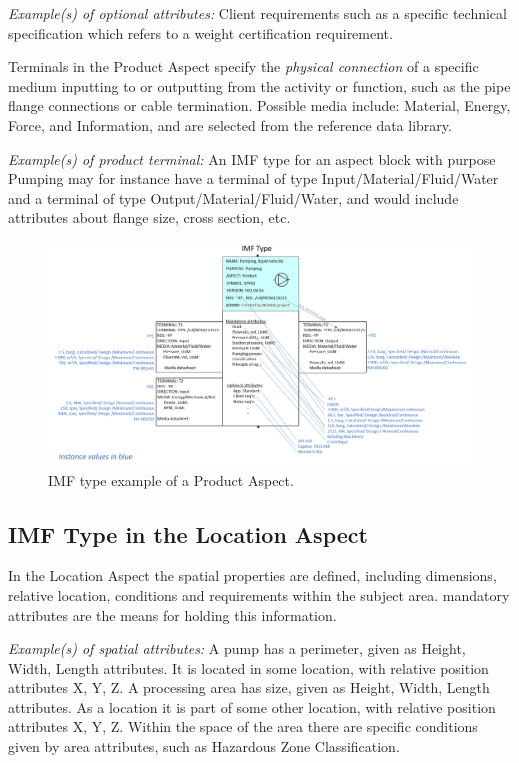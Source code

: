 \documentclass[../main.tex]{subfiles}
\begin{document}
\emph{Example(s) of optional attributes:}
Client requirements such as a specific technical specification which refers to a weight certification
        requirement.

Terminals in the Product Aspect specify the \emph{physical connection} of a specific medium inputting to or
outputting from the activity or function, such as the pipe flange connections or cable termination. Possible media
include: Material, Energy, Force, and Information, and are selected from the reference data library.

\emph{Example(s) of product terminal:}
An IMF type for an aspect block with purpose Pumping may for instance have a terminal of type
        Input/Material/Fluid/Water and a terminal of type Output/Material/Fluid/Water, and would include attributes about flange size, cross section, etc.

\begin{figure}[htb]
  \centering
  \includegraphics[width=1\textwidth]{img/IMFmanual-img069.png}
  \caption{IMF type example of a Product Aspect.}
  \label{fig:Figure 51}
\end{figure}

\subsection{IMF Type in the Location Aspect}
In the Location Aspect the spatial properties are defined, including dimensions, relative
location, conditions and requirements within the subject area. mandatory attributes are the means for holding this information.

\emph{Example(s) of spatial attributes:}
 A pump has a perimeter, given as Height, Width, Length attributes. It is located in some location, with relative
        position attributes X, Y, Z.
 A processing area has size, given as Height, Width, Length attributes. As a location it is part of some other
        location, with relative position attributes X, Y, Z. Within the space of the area there are specific conditions given
        by area attributes, such as Hazardous Zone Classification.
\end{document}
